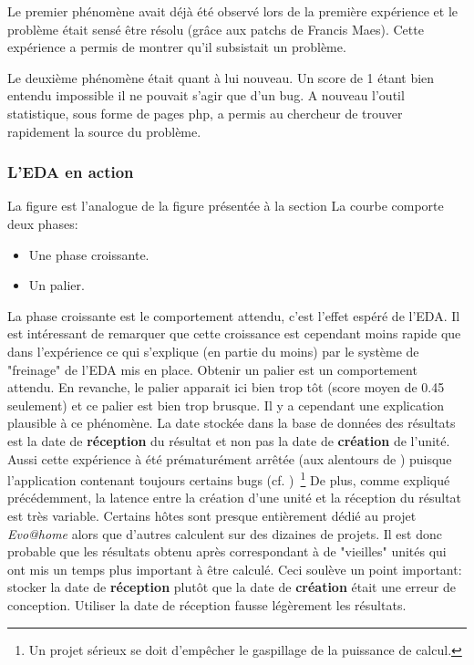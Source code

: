 \documentclass[a4paper, 11pt]{article}
\begin{document}
Le premier phénomène avait déjà été observé lors de la première expérience et le problème était sensé être résolu (grâce aux patchs de Francis Maes). Cette expérience a permis de montrer qu'il subsistait un problème.

Le deuxième phénomène était quant à lui nouveau. Un score de 1 étant bien entendu impossible il ne pouvait s'agir que d'un bug. A nouveau l'outil statistique, sous forme de pages php, a permis au chercheur de trouver rapidement la source du problème.


\subsubsection{L'EDA en action}
La figure %
est l'analogue de la figure %
présentée à la section %
La courbe comporte deux phases:
\begin{itemize}
\item Une phase croissante.
\item Un palier.
\end{itemize}
La phase croissante est le comportement attendu, c'est l'effet espéré de l'EDA. Il est intéressant de remarquer que cette croissance est cependant moins rapide que dans l'expérience ce qui s'explique (en partie du moins) par le système de "freinage" de l'EDA mis en place. %
Obtenir un palier est un comportement attendu. En revanche, le palier apparait ici bien trop tôt (score moyen de 0.45 seulement) et ce palier est bien trop brusque. Il y a cependant une explication plausible à ce phénomène. La date stockée dans la base de données des résultats est la date de \textbf{réception} du résultat et non pas la date de \textbf{création} de l'unité. Aussi cette expérience à été prématurément arrêtée (aux alentours de )%
puisque l'application contenant toujours certains bugs (cf. )~\footnote{Un projet sérieux se doit d'empêcher le gaspillage de la puissance de calcul.} %
De plus, comme expliqué précédemment, la latence entre la création d'une unité et la réception du résultat est très variable. Certains hôtes sont presque entièrement dédié au projet \textit{Evo@home} alors que d'autres calculent sur des dizaines de projets. Il est donc probable que les résultats obtenu après %
correspondant à de "vieilles" unités qui ont mis un temps plus important à être calculé. Ceci soulève un point important: stocker la date de \textbf{réception} plutôt que la date de \textbf{création} était une erreur de conception. Utiliser la date de réception fausse légèrement les résultats.
\end{document}
